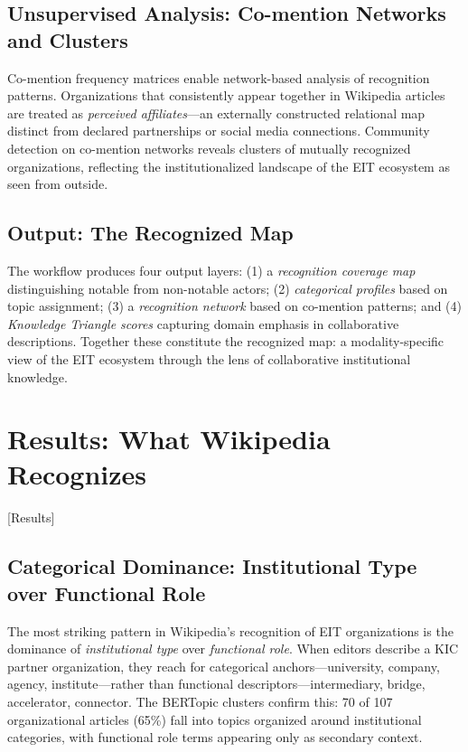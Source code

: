 \documentclass[../main.tex]{subfiles}
\begin{document}
\subsection{Unsupervised Analysis: Co-mention Networks and Clusters}

Co-mention frequency matrices enable network-based analysis of recognition patterns. Organizations that consistently appear together in Wikipedia articles are treated as \emph{perceived affiliates}---an externally constructed relational map distinct from declared partnerships or social media connections. Community detection on co-mention networks reveals clusters of mutually recognized organizations, reflecting the institutionalized landscape of the EIT ecosystem as seen from outside.

\subsection{Output: The Recognized Map}

The workflow produces four output layers: (1) a \emph{recognition coverage map} distinguishing notable from non-notable actors; (2) \emph{categorical profiles} based on topic assignment; (3) a \emph{recognition network} based on co-mention patterns; and (4) \emph{Knowledge Triangle scores} capturing domain emphasis in collaborative descriptions. Together these constitute the recognized map: a modality-specific view of the EIT ecosystem through the lens of collaborative institutional knowledge.


\section{Results: What Wikipedia Recognizes}[Results]

\subsection{Categorical Dominance: Institutional Type over Functional Role}

The most striking pattern in Wikipedia's recognition of EIT organizations is the dominance of \emph{institutional type} over \emph{functional role}. When editors describe a KIC partner organization, they reach for categorical anchors---university, company, agency, institute---rather than functional descriptors---intermediary, bridge, accelerator, connector. The BERTopic clusters confirm this: 70 of 107 organizational articles (65\%) fall into topics organized around institutional categories, with functional role terms appearing only as secondary context.
\end{document}

